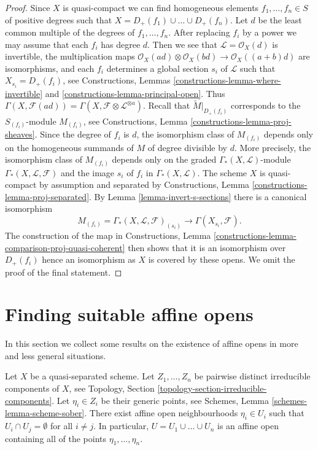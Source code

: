 \begin{proof}
Since $X$ is quasi-compact we can find homogeneous elements
$f_1, \ldots, f_n \in S$ of positive degrees such that
$X = D_+(f_1) \cup \ldots \cup D_+(f_n)$. Let $d$ be the
least common multiple of the degrees of $f_1, \ldots, f_n$.
After replacing $f_i$ by a power we may assume that each
$f_i$ has degree $d$. Then we see that $\mathcal{L} = \mathcal{O}_X(d)$ is
invertible, the multiplication maps
$\mathcal{O}_X(ad) \otimes \mathcal{O}_X(bd) \to \mathcal{O}_X((a + b)d)$
are isomorphisms, and each $f_i$ determines a global section $s_i$
of $\mathcal{L}$ such that $X_{s_i} = D_+(f_i)$, see
Constructions, Lemmas \ref{constructions-lemma-where-invertible} and
\ref{constructions-lemma-principal-open}.
Thus $\Gamma(X, \mathcal{F}(ad)) =
\Gamma(X, \mathcal{F} \otimes \mathcal{L}^{\otimes a})$.
Recall that $\widetilde{M}|_{D_{+}(f_i)}$ corresponds to the
$S_{(f_i)}$-module $M_{(f_i)}$, see
Constructions, Lemma \ref{constructions-lemma-proj-sheaves}.
Since the degree of $f_i$ is $d$, the isomorphism class of
$M_{(f_i)}$ depends only on the homogeneous summands of $M$ of
degree divisible by $d$. More precisely, the isomorphism class of
$M_{(f_i)}$ depends only on the graded $\Gamma_*(X, \mathcal{L})$-module
$\Gamma_*(X, \mathcal{L}, \mathcal{F})$
and the image $s_i$ of $f_i$ in $\Gamma_*(X, \mathcal{L})$.
The scheme $X$ is quasi-compact by assumption and
separated by Constructions, Lemma \ref{constructions-lemma-proj-separated}.
By Lemma \ref{lemma-invert-s-sections} there is a canonical isomorphism
$$
M_{(f_i)} = \Gamma_*(X, \mathcal{L}, \mathcal{F})_{(s_i)} \to
\Gamma(X_{s_i}, \mathcal{F}).
$$
The construction of the map in Constructions, Lemma
\ref{constructions-lemma-comparison-proj-quasi-coherent}
then shows that it is an isomorphism over $D_+(f_i)$
hence an isomorphism as $X$ is covered by these opens.
We omit the proof of the final statement.
\end{proof}




\section{Finding suitable affine opens}
\label{section-finding-affine-opens}

\noindent
In this section we collect some results on the existence of
affine opens in more and less general situations.

\begin{lemma}
\label{lemma-maximal-points-affine}
Let $X$ be a quasi-separated scheme.
Let $Z_1, \ldots, Z_n$ be pairwise distinct irreducible components of $X$,
see Topology, Section \ref{topology-section-irreducible-components}.
Let $\eta_i \in Z_i$ be their generic points, see
Schemes, Lemma \ref{schemes-lemma-scheme-sober}.
There exist affine open neighbourhoods $\eta_i \in U_i$
such that $U_i \cap U_j = \emptyset$ for all $i \not = j$.
In particular, $U = U_1 \cup \ldots \cup U_n$ is an affine
open containing all of the points $\eta_1, \ldots, \eta_n$.
\end{lemma}

